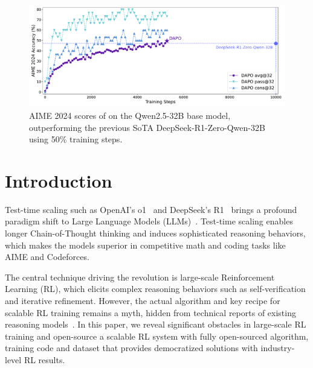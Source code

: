 



\vspace{-20pt}
\begin{figure}[h]
    \centering
    \includegraphics[width=0.92\linewidth]{figures/score.pdf}
    \caption{AIME 2024 scores of \method on the Qwen2.5-32B base model, outperforming the previous SoTA DeepSeek-R1-Zero-Qwen-32B using 50\% training steps.}
    \label{fig:front}
\end{figure}

\newpage
\section{Introduction}

Test-time scaling such as OpenAI's o1~\cite{o1} and DeepSeek's R1~\cite{guo2025deepseek} brings a profound paradigm shift to Large Language Models (LLMs)~\cite{gpt4,claude35sonnet,gpt3,chowdhery2023palm,dsv3}. Test-time scaling enables longer Chain-of-Thought thinking and induces sophisticated reasoning behaviors, which makes the models superior in competitive math and coding tasks like AIME and Codeforces.

The central technique driving the revolution is large-scale Reinforcement Learning (RL), which elicits complex reasoning behaviors such as self-verification and iterative refinement. However, the actual algorithm and key recipe for scalable RL training remains a myth, hidden from technical reports of existing reasoning models~\cite{o1,guo2025deepseek,grok,gemini-thinking,qwq,k1.5}. In this paper, we reveal significant obstacles in large-scale RL training and open-source a scalable RL system with fully open-sourced algorithm, training code and dataset that provides democratized solutions with industry-level RL results. 

